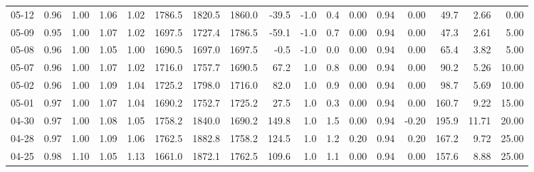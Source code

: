 \begin{threeparttable}
{\begin{tabular}{lrrrrrrrrrrrrrrrr}
  05-12 &         0.96 &           1.00 &          1.06 &          1.02 & 1786.5 & 1820.5 & 1860.0 &      -39.5 &                     -1.0 &                 0.4 &       0.00 &      0.94 &           0.00 &             49.7 &            2.66 &                   0.00 \\
  05-09 &         0.95 &           1.00 &          1.07 &          1.02 & 1697.5 & 1727.4 & 1786.5 &      -59.1 &                     -1.0 &                 0.7 &       0.00 &      0.94 &           0.00 &             47.3 &            2.61 &                   5.00 \\
  05-08 &         0.96 &           1.00 &          1.05 &          1.00 & 1690.5 & 1697.0 & 1697.5 &       -0.5 &                     -1.0 &                 0.0 &       0.00 &      0.94 &           0.00 &             65.4 &            3.82 &                   5.00 \\
  05-07 &         0.96 &           1.00 &          1.07 &          1.02 & 1716.0 & 1757.7 & 1690.5 &       67.2 &                      1.0 &                 0.8 &       0.00 &      0.94 &           0.00 &             90.2 &            5.26 &                  10.00 \\
  05-02 &         0.96 &           1.00 &          1.09 &          1.04 & 1725.2 & 1798.0 & 1716.0 &       82.0 &                      1.0 &                 0.9 &       0.00 &      0.94 &           0.00 &             98.7 &            5.69 &                  10.00 \\
  05-01 &         0.97 &           1.00 &          1.07 &          1.04 & 1690.2 & 1752.7 & 1725.2 &       27.5 &                      1.0 &                 0.3 &       0.00 &      0.94 &           0.00 &            160.7 &            9.22 &                  15.00 \\
  04-30 &         0.97 &           1.00 &          1.08 &          1.05 & 1758.2 & 1840.0 & 1690.2 &      149.8 &                      1.0 &                 1.5 &       0.00 &      0.94 &          -0.20 &            195.9 &           11.71 &                  20.00 \\
  04-28 &         0.97 &           1.00 &          1.09 &          1.06 & 1762.5 & 1882.8 & 1758.2 &      124.5 &                      1.0 &                 1.2 &       0.20 &      0.94 &           0.20 &            167.2 &            9.72 &                  25.00 \\
  04-25 &         0.98 &           1.10 &          1.05 &          1.13 & 1661.0 & 1872.1 & 1762.5 &      109.6 &                      1.0 &                 1.1 &       0.00 &      0.94 &           0.00 &            157.6 &            8.88 &                  25.00 \\

\end{tabular}}
\end{threeparttable}
